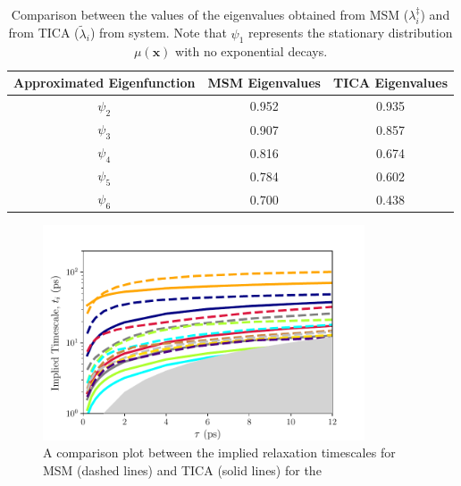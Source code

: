 \begin{spacing}{2.0}
    \begin{table}[!ht]
        \centering
        \caption{Comparison between the values of the eigenvalues obtained from MSM ($\lambda_i^{\ddagger}$) and from TICA ($\tilde{\lambda}_i$) 
                 from  system. Note that $\psi_1$ represents the stationary distribution $\mu(\mathbf{x})$ with no exponential 
                 decays.}
        \label{tab:eigval-comparison}
        \begin{tabular}{|c|c|c|}
            \hline
            \textbf{Approximated Eigenfunction} & \textbf{MSM Eigenvalues} & \textbf{TICA Eigenvalues} \\ \hline
            $\psi_2$ & 0.952 & 0.935 \\
            $\psi_3$ & 0.907 & 0.857 \\
            $\psi_4$ & 0.816 & 0.674 \\
            $\psi_5$ & 0.784 & 0.602 \\
            $\psi_6$ & 0.700 & 0.438 \\ \hline
        \end{tabular}
    \end{table}

    \begin{figure}[H]
        \centering
        \includegraphics[width=0.85\textwidth]{./figs/fig3-04}
        \caption{A comparison plot between the implied relaxation timescales for MSM (dashed lines) and TICA (solid lines) for the }
        \label{fig:tica-msm-comparison}
    \end{figure}


\end{spacing}
